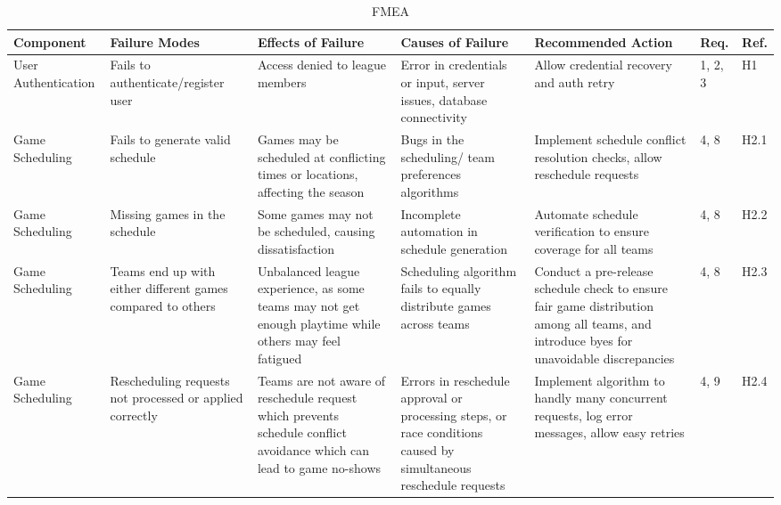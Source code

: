 \documentclass{article}
\begin{document}
\begin{landscape}
\begin{table}[hp]
    \caption{FMEA} \label{FMEA}
    \centering
    \begin{footnotesize}
    \begin{tabular}{|p{1in}|p{1in}|p{1in}|p{1.5in}|p{2.5in}|p{0.2in}|p{0.2in}|}
        \toprule
        \textbf{Component} & \textbf{Failure Modes} & \textbf{Effects of Failure} &\textbf{Causes of Failure}&\textbf{Recommended Action} &\textbf{Req.} &\textbf{Ref.} \\
        \bottomrule
        \hline
        
        User Authentication & 
        Fails to authenticate/register user
        & Access denied to league members & Error in credentials or input, server issues, database connectivity & Allow credential recovery and auth retry & 1, 2, 3 & H1 \\
        \hline
        Game Scheduling  & Fails to generate valid schedule & Games may be scheduled at conflicting times or locations, affecting the season & Bugs in the scheduling/ team preferences algorithms & Implement schedule conflict resolution checks, allow reschedule requests & 4, 8 & H2.1 \\
        \hline
        Game Scheduling  & Missing games in the schedule & Some games may not be scheduled, causing dissatisfaction & Incomplete automation in schedule generation & Automate schedule verification to ensure coverage for all teams & 4, 8 & H2.2 \\
        \hline
        Game Scheduling  &  Teams end up with either different games compared to others & Unbalanced league experience, as some teams may not get enough playtime while others may feel fatigued & Scheduling algorithm fails to equally distribute games across teams & Conduct a pre-release schedule check to ensure fair game distribution among all teams, and introduce byes for unavoidable discrepancies & 4, 8 & H2.3 \\
        \hline
        Game Scheduling  & Rescheduling requests not processed or applied correctly  & Teams are not aware of reschedule request which prevents schedule conflict avoidance which can lead to game no-shows & Errors in reschedule approval or processing steps,  or race conditions caused by simultaneous reschedule requests & Implement algorithm to handly many concurrent requests, log error messages, allow easy retries  & 4, 9 & H2.4 \\

\end{tabular}
\end{footnotesize}
\end{table}
\end{landscape}
\end{document}
